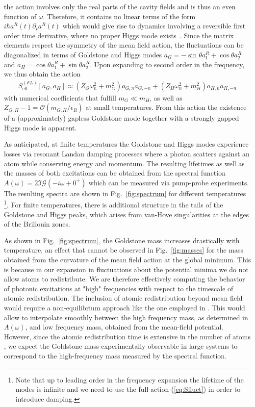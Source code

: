 \documentclass[12pt]{iopart}
\begin{document}
the action involves only the real parts of the cavity fields and is thus an even function of $\omega$. Therefore,
it contains no linear terms of the form $i\hbar a^R(t)\partial_t a^R(t)$ which would give rise to dynamics 
involving a reversible first order time derivative, where no proper Higgs mode exists~\cite{pekker2015}. 
Since the matrix elements respect the symmetry of the mean field
action, the fluctuations can be diagonalized in terms of Goldstone
and Higgs modes $a_G=-\sin{\theta}a_1^R+\cos{\theta} a_2^R$ and
$a_H=\cos{\theta}a_1^R+\sin{\theta} a_2^R$. 
Upon expanding to second order in the frequency, we thus obtain the action
\begin{align}
S_\text{eff}^{(FL)}[a_G,a_H]\approx\left(Z_G\omega_n^2+ m_G^2\right)a_{G,n}a_{G,-n}+\left(Z_H\omega_n^2+ m_H^2\right)a_{H,n}a_{H,-n}
\end{align}
with numerical coefficients that fulfill $m_G \ll m_H$, as well as
$Z_{G,H}-1=\mathcal{O}(m_{G,H}/\epsilon_R)$ at small
temperatures. From this action the
existence of a (approximately) gapless Goldstone mode together with a
strongly gapped Higgs mode is apparent.

As anticipated, at finite temperatures the Goldstone and Higgs modes experience losses via resonant
Landau damping processes where a photon scatters against an atom while conserving energy
and momentum.
The resulting lifetimes as well as the masses of both
excitations can be obtained from the spectral function $A(\omega)=2
\Im{\mathcal{G}(-i\omega+0^+)}$ which can be measured via
pump-probe experiments. The resulting spectra are shown in Fig.~\ref{fig:spectrum}
for different temperatures \footnote{Note that up to leading order in
  the frequency expansion the lifetime of the modes is infinite and we
need to use the full action (\ref{eq:Sfluct}) in order to introduce
damping.}. 
For finite temperatures, there is additional structure in
the tails of the Goldstone and Higgs peaks, which arises from van-Hove
 singularities at the edges of the Brillouin zones.

As shown in Fig.~\ref{fig:spectrum}, the Goldstone mass increases
drastically with temperature, an effect that cannot be observed in
Fig.~\ref{fig:masses} for the mass obtained from the curvature of the mean field
action at the global minimum. This is because in our expansion in fluctuations about the
potential minima we do not allow atoms to redistribute. We 
are therefore effectively computing the behavior of photonic excitations at "high" frequencies
with respect to the timescale of atomic redistribution. 
The inclusion of atomic redistribution beyond mean field would require
a non-equilibrium approach like the one employed in
\cite{piazza_QKE}. This would allow to interpolate smoothly between
the high frequency mass, as determined in $A(\omega)$, and low
frequency mass, obtained from the mean-field potential.
However, since the atomic redistribution time is extensive in the number of atoms \cite{piazza_QKE}, we 
expect the Goldstone mass experimentally observable in large systems to
correspond to the high-frequency mass measured by the spectral function.\\
\end{document}
